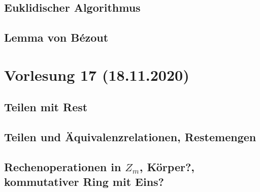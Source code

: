 \documentclass[]{article}
\begin{document}
\subsection{Euklidischer Algorithmus}
\subsection{Lemma von Bézout}



\section{Vorlesung 17 (18.11.2020)}
\subsection{Teilen mit Rest}
\subsection{Teilen und Äquivalenzrelationen, Restemengen}
\subsection{Rechenoperationen in $Z_m$, Körper?, kommutativer Ring mit Eins?}

\end{document}
